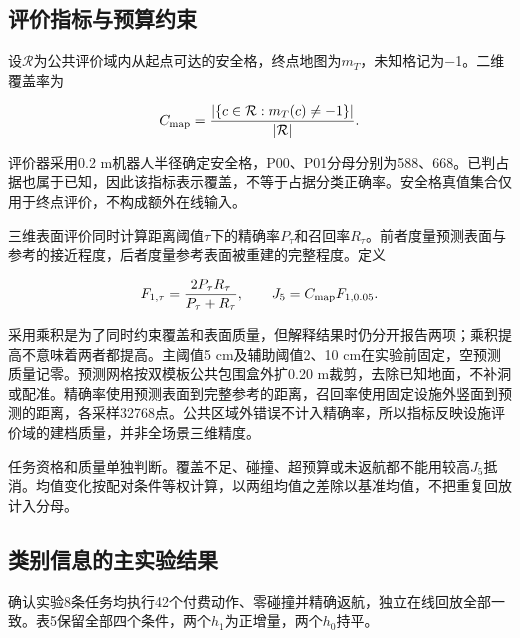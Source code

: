 \documentclass[11pt,a4paper]{article}
\begin{document}
\hypertarget{ux8bc4ux4ef7ux6307ux6807ux4e0eux9884ux7b97ux7ea6ux675f}{%
\subsection{评价指标与预算约束}\label{ux8bc4ux4ef7ux6307ux6807ux4e0eux9884ux7b97ux7ea6ux675f}}

设\(\mathcal R\)为公共评价域内从起点可达的安全格，终点地图为\(m_T\)，未知格记为−1。二维覆盖率为

\[
C_{\rm map}=\frac{|\{c\in\mathcal R:m_T(c)\ne-1\}|}{|\mathcal R|}.
\]

评价器采用0.2 m机器人半径确定安全格，P00、P01分母分别为588、668。已判占据也属于已知，因此该指标表示覆盖，不等于占据分类正确率。安全格真值集合仅用于终点评价，不构成额外在线输入。

三维表面评价同时计算距离阈值\(\tau\)下的精确率\(P_\tau\)和召回率\(R_\tau\)。前者度量预测表面与参考的接近程度，后者度量参考表面被重建的完整程度。定义

\[
F_{1,\tau}=\frac{2P_\tau R_\tau}{P_\tau+R_\tau},
\qquad J_5=C_{\rm map}F_{1,0.05}.
\]

采用乘积是为了同时约束覆盖和表面质量，但解释结果时仍分开报告两项；乘积提高不意味着两者都提高。主阈值5 cm及辅助阈值2、10 cm在实验前固定，空预测质量记零。预测网格按双模板公共包围盒外扩0.20 m裁剪，去除已知地面，不补洞或配准。精确率使用预测表面到完整参考的距离，召回率使用固定设施外竖面到预测的距离，各采样32768点。公共区域外错误不计入精确率，所以指标反映设施评价域的建档质量，并非全场景三维精度。

任务资格和质量单独判断。覆盖不足、碰撞、超预算或未返航都不能用较高\(J_5\)抵消。均值变化按配对条件等权计算，以两组均值之差除以基准均值，不把重复回放计入分母。

\hypertarget{ux7c7bux522bux4fe1ux606fux7684ux4e3bux5b9eux9a8cux7ed3ux679c}{%
\subsection{类别信息的主实验结果}\label{ux7c7bux522bux4fe1ux606fux7684ux4e3bux5b9eux9a8cux7ed3ux679c}}

确认实验8条任务均执行42个付费动作、零碰撞并精确返航，独立在线回放全部一致。表5保留全部四个条件，两个\(h_1\)为正增量，两个\(h_0\)持平。
\end{document}
